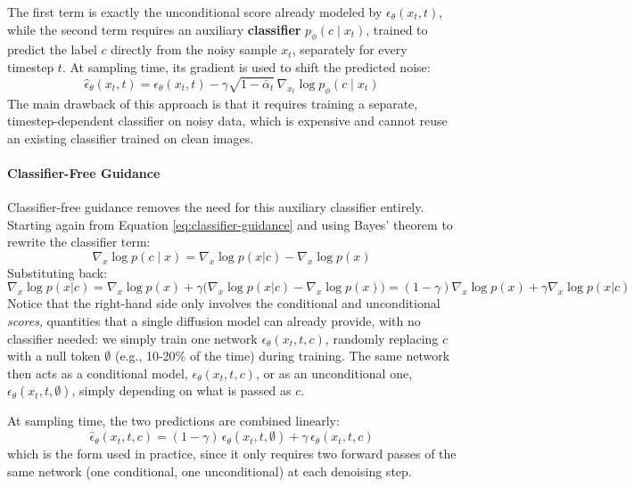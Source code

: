 The first term is exactly the unconditional score already modeled by \(\epsilon_\theta(x_t, t)\), while the second term requires an auxiliary \textbf{classifier} \(p_\phi(c \mid x_t)\), trained to predict the label \(c\) directly from the noisy sample \(x_t\), separately for every timestep \(t\).
At sampling time, its gradient is used to shift the predicted noise:
\[
    \hat\epsilon_\theta(x_t, t) = \epsilon_\theta(x_t, t) - \gamma \sqrt{1 - \bar\alpha_t} \, \nabla_{x_t} \log p_\phi(c \mid x_t)
\]
The main drawback of this approach is that it requires training a separate, timestep-dependent classifier on noisy data, which is expensive and cannot reuse an existing classifier trained on clean images.

\paragraph{Classifier-Free Guidance}
Classifier-free guidance removes the need for this auxiliary classifier entirely.
Starting again from Equation \ref{eq:classifier-guidance} and using Bayes' theorem to rewrite the classifier term:
\[
    \nabla_x \log p(c \mid x) = \nabla_x \log p(x|c) - \nabla_x \log p(x)
\]
Substituting back:
\[
    \nabla_x \log p(x|c) = \nabla_x \log p(x) + \gamma \big( \nabla_x \log p(x|c) - \nabla_x \log p(x) \big)
    = (1 - \gamma) \nabla_x \log p(x) + \gamma \nabla_x \log p(x|c)
\]
Notice that the right-hand side only involves the conditional and unconditional \emph{scores}, quantities that a single diffusion model can already provide, with no classifier needed: we simply train one network \(\epsilon_\theta(x_t, t, c)\), randomly replacing \(c\) with a null token \(\emptyset\) (e.g., 10-20\% of the time) during training. The same network then acts as a conditional model, \(\epsilon_\theta(x_t, t, c)\), or as an unconditional one, \(\epsilon_\theta(x_t, t, \emptyset)\), simply depending on what is passed as \(c\).

At sampling time, the two predictions are combined linearly:
\begin{equation}
    \label{eq:classifier-free-guidance}
    \hat\epsilon_\theta(x_t, t, c) = (1 - \gamma) \, \epsilon_\theta(x_t, t, \emptyset) + \gamma \, \epsilon_\theta(x_t, t, c)
\end{equation}
which is the form used in practice, since it only requires two forward passes of the same network (one conditional, one unconditional) at each denoising step.

